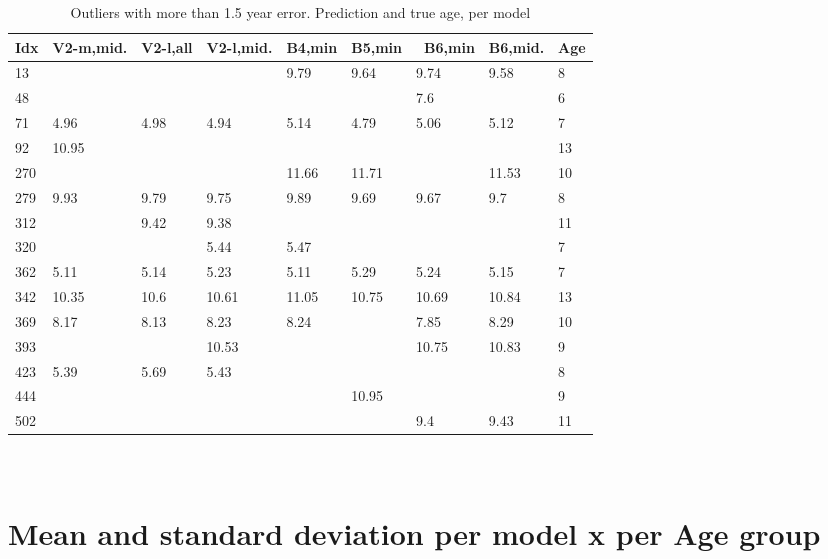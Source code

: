 \documentclass[10pt,letterpaper]{article}
\begin{document}
\begin{table}[!ht]
    \centering
    \caption{Outliers with more than 1.5 year error. Prediction and true age, per model}
    \begin{tabular}{|l|l|l|l|l|l|l|l|l|}
    \hline
        Idx & V2-m,mid. & V2-l,all & V2-l,mid. & B4,min & B5,min &  B6,min & B6,mid. & Age  \\ \hline
        13 & ~ & ~ & ~ & 9.79 & 9.64 & 9.74 & 9.58 & 8  \\ \hline
        48 & ~ & ~ & ~ & ~ & ~ & 7.6 & ~ & 6  \\ \hline
        71 & 4.96 & 4.98 & 4.94 & 5.14 & 4.79 & 5.06 & 5.12 & 7  \\ \hline
        92 & 10.95 & ~ & ~ & ~ & ~ & ~ & ~ & 13  \\ \hline
        270 & ~ & ~ & ~ & 11.66 & 11.71 & ~ & 11.53 & 10  \\ \hline
        279 & 9.93 & 9.79 & 9.75 & 9.89 & 9.69 & 9.67 & 9.7 & 8  \\ \hline
        312 & ~ & 9.42 & 9.38 & ~ & ~ & ~ & ~ & 11  \\ \hline
        320 & ~ & ~ & 5.44 & 5.47 & ~ & ~ & ~ & 7  \\ \hline
        362 & 5.11 & 5.14 & 5.23 & 5.11 & 5.29 & 5.24 & 5.15 & 7  \\ \hline
        342 & 10.35 & 10.6 & 10.61 & 11.05 & 10.75 & 10.69 & 10.84 & 13  \\ \hline
        369 & 8.17 & 8.13 & 8.23 & 8.24 & ~ & 7.85 & 8.29 & 10  \\ \hline
        393 & ~ & ~ & 10.53 & ~ & ~ & 10.75 & 10.83 & 9  \\ \hline
        423 & 5.39 & 5.69 & 5.43 & ~ & ~ & ~ & ~ & 8  \\ \hline
        444 & ~ & ~ & ~ & ~ & 10.95 & ~ & ~ & 9  \\ \hline
        502 & ~ & ~ & ~ & ~ & ~ & 9.4 & 9.43 & 11  \\ \hline
    \end{tabular}
\end{table}

\section{\\Mean and standard deviation per model x per Age group}
\end{document}
